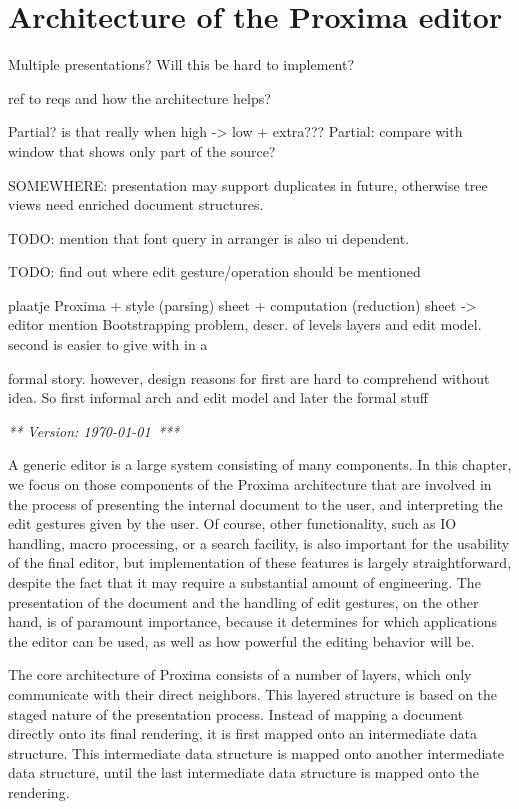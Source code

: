 \chapter{Architecture of the Proxima editor}
\label{chap:proxArch}

\bc
Multiple presentations? Will this be hard to implement?

ref to reqs and how the architecture helps?

Partial? is that really when high -> low + extra???
Partial: compare with window that shows only part of the source?

SOMEWHERE: presentation may support duplicates in future, otherwise tree views need enriched 
 document structures.

TODO: mention that font query in arranger is also ui dependent.

TODO: find out where edit gesture/operation should be mentioned

plaatje Proxima + style (parsing) sheet + computation (reduction) sheet -> editor mention Bootstrapping problem, descr. of levels layers and edit model. second is easier to give with in a

formal story. however, design reasons for first are hard to comprehend without idea. So first informal arch 
 and edit model and later the formal stuff
\ec


{\em *** Version: \today~***}


A generic editor is a large system consisting of many components. In this chapter, we focus on those components of the Proxima architecture that are involved in the process of presenting the internal document to the user, and interpreting the edit gestures given by the user. Of course, other functionality, such as IO handling, macro processing, or a search facility, is also important for the usability of the final editor, but implementation of these features is largely straightforward, despite the fact that it may require a substantial amount of engineering. The presentation of the document and the handling of edit gestures, on the other hand, is of paramount importance, because it determines for which applications the editor can be used, as well as how powerful the editing behavior will be.

The core architecture of Proxima consists of a number of layers, which only communicate with their direct neighbors. This layered structure is based on the staged nature of the presentation process. Instead of mapping a document directly onto its final rendering, it is first mapped onto an intermediate data structure. This intermediate data structure is mapped onto another intermediate data structure, until the last intermediate data structure is mapped onto the rendering. 

